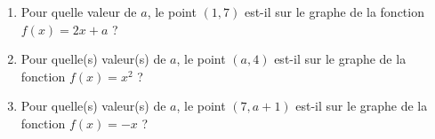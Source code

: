 
\begin{exercice}\label{exoSeconde-0075}

    \begin{enumerate}
        \item
            Pour quelle valeur de \( a\), le point \( (1,7)\) est-il sur le graphe de la fonction \( f(x)=2x+a\) ?
        \item
            Pour quelle(s) valeur(s) de \( a\), le point \( (a,4)\) est-il sur le graphe de la fonction \( f(x)=x^2\) ?
        \item
            Pour quelle(s) valeur(s) de \( a\), le point \( (7,a+1)\) est-il sur le graphe de la fonction \( f(x)=-x\) ?
    \end{enumerate}

\end{exercice}
